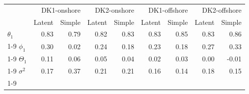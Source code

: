 \begin{table}[htb]
\centering
\begin{tabular}{lrrrrrrrr}
\toprule
 & \multicolumn{2}{r}{DK1-onshore} & \multicolumn{2}{r}{DK2-onshore} & \multicolumn{2}{r}{DK1-offshore} & \multicolumn{2}{r}{DK2-offshore} \\
 & Latent & Simple & Latent & Simple & Latent & Simple & Latent & Simple \\
\midrule
$\theta_1$ & 0.83 & 0.79 & 0.82 & 0.83 & 0.83 & 0.85 & 0.83 & 0.86 \\
\cline{1-9}
$\phi_1$ & 0.30 & 0.02 & 0.24 & 0.18 & 0.23 & 0.18 & 0.27 & 0.33 \\
\cline{1-9}
$\Theta_1$ & 0.11 & 0.06 & 0.05 & 0.04 & 0.02 & 0.03 & 0.00 & -0.01 \\
\cline{1-9}
$\sigma^2$ & 0.17 & 0.37 & 0.21 & 0.21 & 0.16 & 0.14 & 0.18 & 0.15 \\
\cline{1-9}
\bottomrule
\end{tabular}
\end{table}

